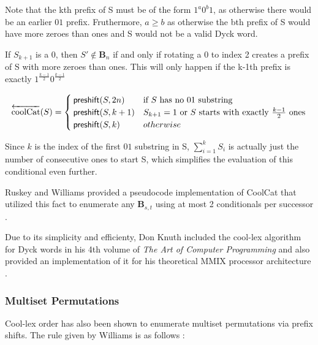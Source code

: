 Note that the kth prefix of S must be of the form $1^a0^b1$, as otherwise there would be an earlier $01$ prefix.  Fruthermore, $a\ge b$ as otherwise the bth prefix of S would have more zeroes than ones and S would not be a valid Dyck word.

If $S_{k+1}$ is a 0, then $S' \notin \mathbf{B}_n$ if and only if rotating a 0 to index 2 creates a prefix of S with more zeroes than ones.  This will only happen if the k-1th prefix is exactly $1^{\frac{k-1}{2}}0^{\frac{k-1}{2}}$

\begin{equation*}
    \overleftarrow{\text{coolCat}}(S) = \begin{cases}
	\mathsf{preshift(} S, 2n \mathsf{)} & \text{if $S$ has no $01$ substring}\\
	\mathsf{preshift(} S, k+1 \mathsf{)} & \text{$S_{k+1}=1$ or $S$ starts with exactly $\frac{k-1}{2}$ ones}\\
	\mathsf{preshift(} S, k \mathsf{)} & otherwise \\
\end{cases}
\end{equation*}

Since $k$ is the index of the first $01$ substring in S, $\sum_{i=1}^{k}S_i$ is actually just the number of consecutive ones to start S, which simplifies the evaluation of this conditional even further.

Ruskey and Williams provided a pseudocode implementation of CoolCat that utilized this fact to enumerate any $\mathbf{B}_{s,t}$ using at most 2 conditionals per successor \cite{ruskey2008generating}.


Due to its simplicity and efficienty, Don Knuth included the cool-lex algorithm for Dyck words in his 4th volume of \emph{The Art of Computer Programming} and also provided an implementation of it for his theoretical MMIX processor architecture \cite{knuth2015art}.

\subsubsection{Multiset Permutations}

Cool-lex order has also been shown to enumerate multiset permutations via prefix shifts.  The rule given by Williams is as follows \cite{williams2009loopless}:
\bigskip

